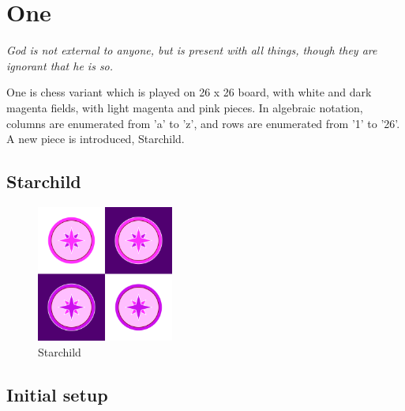 \documentclass[a5paper,12pt,draft]{book} %
\begin{document}
\clearpage

\chapter*{One}

\begin{flushright}
\parbox{0.8\textwidth}{
\emph{God is not external to anyone, but is present with all things, though
they are ignorant that he is so. \\
 } }
\end{flushright}

\noindent
One is chess variant which is played on 26 x 26 board, with white
and dark magenta fields, with light magenta and pink pieces. In
algebraic notation, columns are enumerated from 'a' to 'z', and
rows are enumerated from '1' to '26'. A new piece is introduced,
Starchild.

\clearpage

\section*{Starchild}

\noindent
\begin{figure}
\includegraphics[width=0.4\textwidth, keepaspectratio=true]{../gfx/pieces/16_starchild.png}
\caption{Starchild}
\label{fig:starchild}
\end{figure}

\clearpage

\section*{Initial setup}
\end{document}
